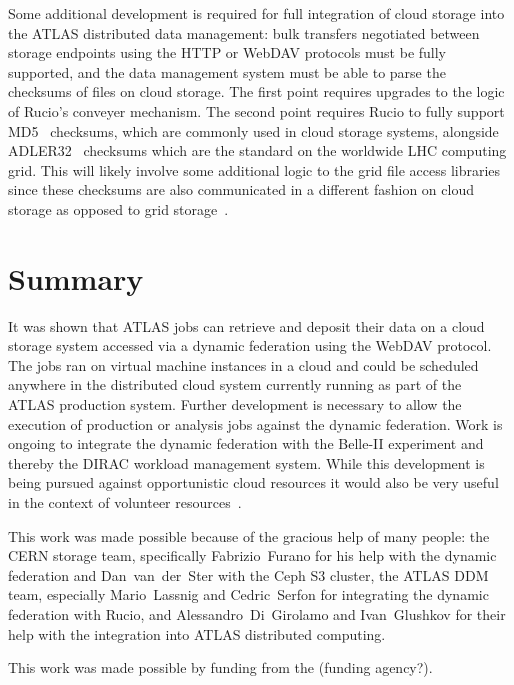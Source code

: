 \documentclass[a4paper]{jpconf}
\begin{document}
Some additional development is required for full integration of cloud storage into the ATLAS distributed data management: bulk transfers negotiated between storage endpoints using the HTTP or WebDAV protocols must be fully supported, and the data management system must be able to parse the checksums of files on cloud storage. The first point requires upgrades to the logic of Rucio's conveyer mechanism. The second point requires Rucio to fully support MD5~\cite{md5} checksums, which are commonly used in cloud storage systems, alongside ADLER32~\cite{adler32} checksums which are the standard on the worldwide LHC computing grid. This will likely involve some additional logic to the grid file access libraries since these checksums are also communicated in a different fashion on cloud storage as opposed to grid storage~\cite{content-md5, request-digest}.

\section{Summary}
It was shown that ATLAS jobs can retrieve and deposit their data on a cloud storage system accessed via a dynamic federation using the WebDAV protocol. The jobs ran on virtual machine instances in a cloud and could be scheduled anywhere in the distributed cloud system currently running as part of the ATLAS production system. Further development is necessary to allow the execution of production or analysis jobs against the dynamic federation. Work is ongoing to integrate the dynamic federation with the Belle-II experiment and thereby the DIRAC workload management system. While this development is being pursued against opportunistic cloud resources it would also be very useful in the context of volunteer resources~\cite{boinc}.

\ack
This work was made possible because of the gracious help of many people: the CERN storage team, specifically Fabrizio~Furano for his help with the dynamic federation and Dan~van~der~Ster with the Ceph S3 cluster, the ATLAS DDM team, especially Mario~Lassnig and Cedric~Serfon for integrating the dynamic federation with Rucio, and Alessandro~Di~Girolamo and Ivan~Glushkov for their help with the integration into ATLAS distributed computing.

This work was made possible by funding from the (funding agency?).
\end{document}
